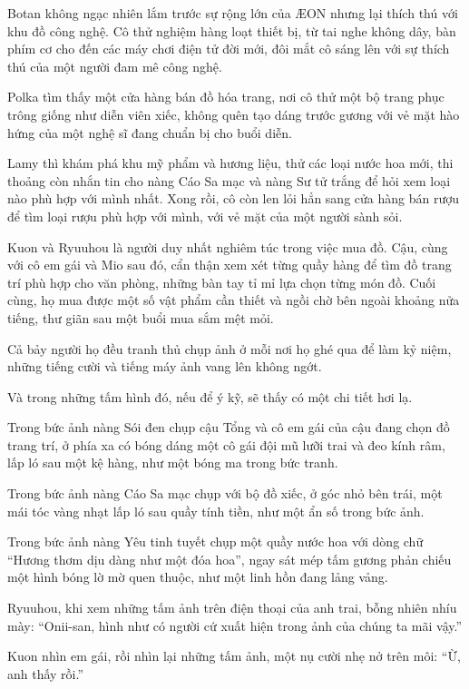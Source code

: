 \documentclass[../main.tex]{subfiles}
\begin{document}
Botan không ngạc nhiên lắm trước sự rộng lớn của \AE ON nhưng lại thích thú với khu đồ công nghệ. Cô thử nghiệm hàng loạt thiết bị, từ tai nghe không dây, bàn phím cơ cho đến các máy chơi điện tử đời mới, đôi mắt cô sáng lên với sự thích thú của một người đam mê công nghệ.

Polka tìm thấy một cửa hàng bán đồ hóa trang, nơi cô thử một bộ trang phục trông giống như diễn viên xiếc, không quên tạo dáng trước gương với vẻ mặt hào hứng của một nghệ sĩ đang chuẩn bị cho buổi diễn.

Lamy thì khám phá khu mỹ phẩm và hương liệu, thử các loại nước hoa mới, thi thoảng còn nhắn tin cho nàng Cáo Sa mạc và nàng Sư tử trắng để hỏi xem loại nào phù hợp với mình nhất. Xong rồi, cô còn len lỏi hẳn sang cửa hàng bán rượu để tìm loại rượu phù hợp với mình, với vẻ mặt của một người sành sỏi.

Kuon và Ryuuhou là người duy nhất nghiêm túc trong việc mua đồ. Cậu, cùng với cô em gái và Mio sau đó, cẩn thận xem xét từng quầy hàng để tìm đồ trang trí phù hợp cho văn phòng, những bàn tay tỉ mỉ lựa chọn từng món đồ. Cuối cùng, họ mua được một số vật phẩm cần thiết và ngồi chờ bên ngoài khoảng nửa tiếng, thư giãn sau một buổi mua sắm mệt mỏi.

Cả bảy người họ đều tranh thủ chụp ảnh ở mỗi nơi họ ghé qua để làm kỷ niệm, những tiếng cười và tiếng máy ảnh vang lên không ngớt.


Và trong những tấm hình đó, nếu để ý kỹ, sẽ thấy có một chi tiết hơi lạ.

Trong bức ảnh nàng Sói đen chụp cậu Tổng và cô em gái của cậu đang chọn đồ trang trí, ở phía xa có bóng dáng một cô gái đội mũ lưỡi trai và đeo kính râm, lấp ló sau một kệ hàng, như một bóng ma trong bức tranh.

Trong bức ảnh nàng Cáo Sa mạc chụp với bộ đồ xiếc, ở góc nhỏ bên trái, một mái tóc vàng nhạt lấp ló sau quầy tính tiền, như một ẩn số trong bức ảnh.

Trong bức ảnh nàng Yêu tinh tuyết chụp một quầy nước hoa với dòng chữ ``Hương thơm dịu dàng như một đóa hoa'', ngay sát mép tấm gương phản chiếu một hình bóng lờ mờ quen thuộc, như một linh hồn đang lảng vảng.

Ryuuhou, khi xem những tấm ảnh trên điện thoại của anh trai, bỗng nhiên nhíu mày: ``Onii-san, hình như có người cứ xuất hiện trong ảnh của chúng ta mãi vậy.''

Kuon nhìn em gái, rồi nhìn lại những tấm ảnh, một nụ cười nhẹ nở trên môi: ``Ừ, anh thấy rồi.''
\end{document}
